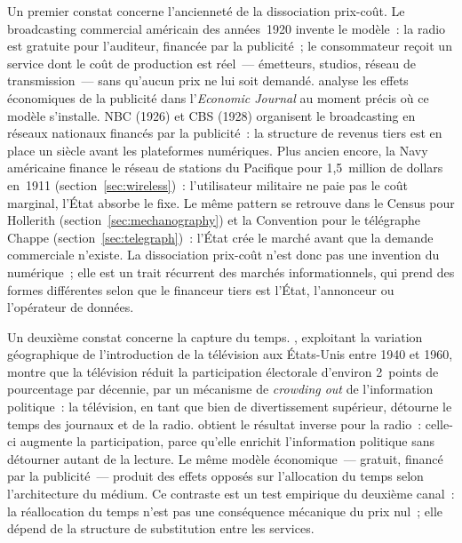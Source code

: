 Un premier constat concerne l'ancienneté de la dissociation prix-coût. Le broadcasting commercial américain des années~1920 invente le modèle~: la radio est gratuite pour l'auditeur, financée par la publicité~; le consommateur reçoit un service dont le coût de production est réel~--- émetteurs, studios, réseau de transmission~--- sans qu'aucun prix ne lui soit demandé. \textcite{braithwaite_economic_1928} analyse les effets économiques de la publicité dans l'\emph{Economic Journal} au moment précis où ce modèle s'installe. NBC (1926) et CBS (1928) organisent le broadcasting en réseaux nationaux financés par la publicité~: la structure de revenus tiers est en place un siècle avant les plateformes numériques. Plus ancien encore, la Navy américaine finance le réseau de stations du Pacifique pour 1,5~million de dollars en~1911 (section~\ref{sec:wireless})~: l'utilisateur militaire ne paie pas le coût marginal, l'État absorbe le fixe. Le même pattern se retrouve dans le Census pour Hollerith (section~\ref{sec:mechanography}) et la Convention pour le télégraphe Chappe (section~\ref{sec:telegraph})~: l'État crée le marché avant que la demande commerciale n'existe. La dissociation prix-coût n'est donc pas une invention du numérique~; elle est un trait récurrent des marchés informationnels, qui prend des formes différentes selon que le financeur tiers est l'État, l'annonceur ou l'opérateur de données.

Un deuxième constat concerne la capture du temps. \textcite{gentzkow_television_2006}, exploitant la variation géographique de l'introduction de la télévision aux États-Unis entre 1940 et 1960, montre que la télévision réduit la participation électorale d'environ 2~points de pourcentage par décennie, par un mécanisme de \emph{crowding out} de l'information politique~: la télévision, en tant que bien de divertissement supérieur, détourne le temps des journaux et de la radio. \textcite{stromberg_radio_2004} obtient le résultat inverse pour la radio~: celle-ci augmente la participation, parce qu'elle enrichit l'information politique sans détourner autant de la lecture. Le même modèle économique~--- gratuit, financé par la publicité~--- produit des effets opposés sur l'allocation du temps selon l'architecture du médium. Ce contraste est un test empirique du deuxième canal~: la réallocation du temps n'est pas une conséquence mécanique du prix nul~; elle dépend de la structure de substitution entre les services.

